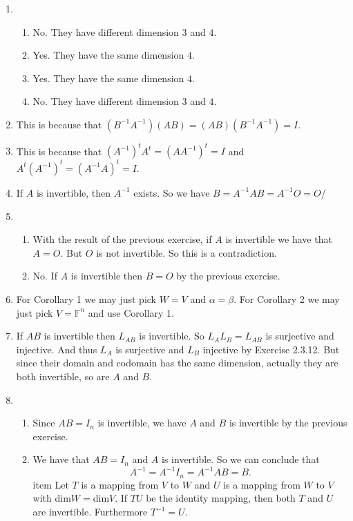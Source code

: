 \begin{enumerate}
\begin{enumerate}
\end{enumerate}
\item \begin{enumerate}
\item No. They have different dimension $3$ and $4$.
\item Yes. They have the same dimension $4$.
\item Yes. They have the same dimension $4$.
\item No. They have different dimension $3$ and $4$.
\end{enumerate}
\item This is because that $(B^{-1}A^{-1})(AB)=(AB)(B^{-1}A^{-1})=I$.
\item This is because that $(A^{-1})^tA^t=(AA^{-1})^t=I$ and $A^t(A^{-1})^t=(A^{-1}A)^t=I$.
\item If $A$ is invertible, then $A^{-1}$ exists. So we have $B=A^{-1}AB=A^{-1}O=O$/
\item \begin{enumerate}
\item With the result of the previous exercise, if $A$ is invertible we have that $A=O$. But $O$ is not invertible. So this is a contradiction.
\item No. If $A$ is invertible then $B=O$ by the previous exercise.
\end{enumerate}
\item For Corollary 1 we may just pick $W=V$ and $\alpha =\beta $. For Corollary 2 we may just pick $V=\mathbb{F}^n$ and use Corollary 1.
\item If $AB$ is invertible then $L_{AB}$ is invertible. So $L_AL_B=L_{AB}$ is surjective and injective. And thus $L_A$ is surjective and $L_B$ injective by Exercise 2.3.12. But since their domain and codomain has the same dimension, actually they are both invertible, so are $A$ and $B$.
\item \begin{enumerate}
\item Since $AB=I_n$ is invertible, we have $A$ and $B$ is invertible by the previous exercise.
\item We have that $AB=I_n$ and $A$ is invertible. So we can conclude that \[A^{-1}=A^{-1}I_n=A^{-1}AB=B.\]
item Let $T$ is a mapping from $V$ to $W$ and $U$ is a mapping from $W$ to $V$ with dim$W=$dim$V$. If $TU$ be the identity mapping, then both $T$ and $U$ are invertible. Furthermore $T^{-1}=U$.


\end{enumerate}
\end{enumerate}
